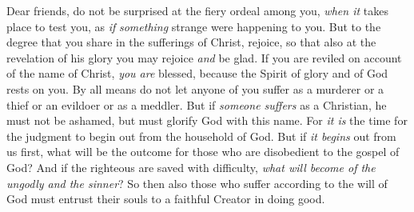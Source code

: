 \begin{biblechapter}
 Dear friends, do not be surprised at the fiery ordeal among you, \textit{when it} takes place to test you, as \textit{if} \textit{something} strange were happening to you.
\verse But to the degree that you share in the sufferings of Christ, rejoice, so that also at the revelation of his glory you may rejoice \textit{and} be glad.
\verse If you are reviled on account of the name of Christ, \textit{you are} blessed, because the Spirit of glory and of God rests on you.
\verse By all means do not let anyone of you suffer as a murderer or a thief or an evildoer or as a meddler.
\verse But if \textit{someone suffers} as a Christian, he must not be ashamed, but must glorify God with this name.
\verse For \textit{it is} the time for the judgment to begin out from the household of God. But if \textit{it begins} out from us first, what will be the outcome for those who are disobedient to the gospel of God?
\verse And if the righteous are saved with difficulty, \textit{what will become of the ungodly and the sinner}?
\verse So then also those who suffer according to the will of God must entrust their souls to a faithful Creator in doing good.
\end{biblechapter}

